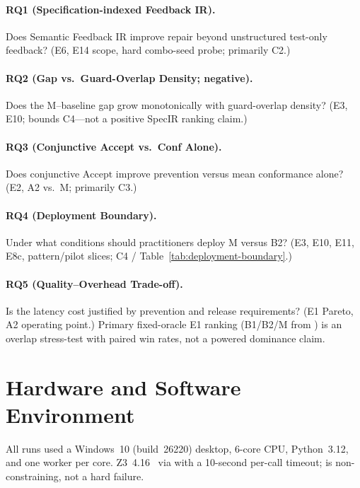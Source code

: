 \paragraph{RQ1 (Specification-indexed Feedback IR).}
Does Semantic Feedback IR improve repair beyond unstructured test-only
feedback?
(E6, E14 scope, hard combo-seed probe; primarily C2.)

\paragraph{RQ2 (Gap vs.\ Guard-Overlap Density; negative).}
Does the M--baseline gap grow monotonically with guard-overlap density?
(E3, E10; bounds C4---not a positive SpecIR ranking claim.)

\paragraph{RQ3 (Conjunctive Accept vs.\ Conf Alone).}
Does conjunctive $\mathrm{Accept}$ improve prevention versus mean
conformance alone?
(E2, A2 vs.\ M; primarily C3.)

\paragraph{RQ4 (Deployment Boundary).}
Under what conditions should practitioners deploy M versus B2?
(E3, E10, E11, E8c, pattern/pilot slices; C4 /
Table~\ref{tab:deployment-boundary}.)

\paragraph{RQ5 (Quality--Overhead Trade-off).}
Is the latency cost justified by prevention and release requirements?
(E1 Pareto, A2 operating point.)
Primary fixed-oracle E1 ranking (B1/B2/M from )
is an overlap stress-test with paired win rates, not a powered dominance
claim.

\section{Hardware and Software Environment}
\label{sec:exp:environment}

All runs used a Windows~10 (build~26220) desktop, 6-core CPU,
Python~3.12, and one  worker per core.
Z3~4.16~\citep{demoura2008z3,barrett2018smt} via  with a
10-second per-call timeout;  is non-constraining, not a hard
failure.

